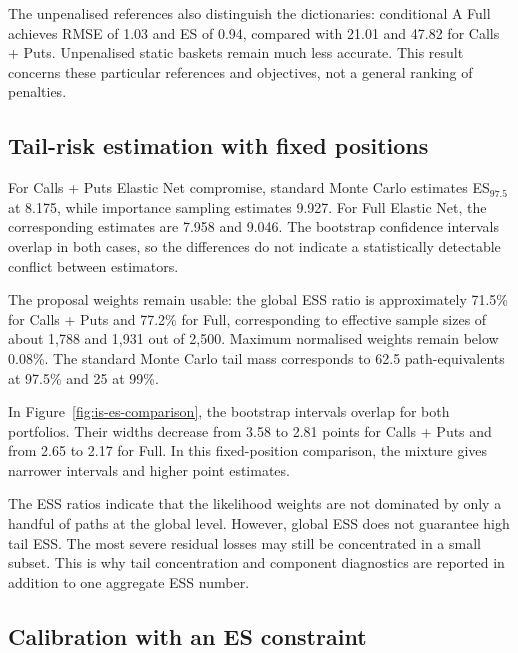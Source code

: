 The unpenalised references also distinguish the dictionaries: conditional A
Full achieves RMSE of 1.03 and ES of 0.94, compared with 21.01 and 47.82 for
Calls + Puts. Unpenalised static baskets remain much less accurate. This
result concerns these particular references and objectives, not a general
ranking of penalties.

\subsection{Tail-risk estimation with fixed positions}

For Calls + Puts Elastic Net compromise, standard Monte Carlo estimates ES$_{97.5}$ at 8.175, while importance sampling estimates 9.927. For Full Elastic Net, the corresponding estimates are 7.958 and 9.046. The bootstrap confidence intervals overlap in both cases, so the differences do not indicate a statistically detectable conflict between estimators.

The proposal weights remain usable: the global ESS ratio is approximately 71.5\% for Calls + Puts and 77.2\% for Full, corresponding to effective sample sizes of about 1,788 and 1,931 out of 2,500. Maximum normalised weights remain below 0.08\%. The standard Monte Carlo tail mass corresponds to 62.5 path-equivalents at 97.5\% and 25 at 99\%.


In Figure~\ref{fig:is-es-comparison}, the bootstrap intervals overlap for both portfolios. Their widths decrease from 3.58 to 2.81 points for Calls + Puts and from 2.65 to 2.17 for Full. In this fixed-position comparison, the mixture gives narrower intervals and higher point estimates.

The ESS ratios indicate that the likelihood weights are not dominated by only
a handful of paths at the global level. However, global ESS does not guarantee
high tail ESS. The most severe residual losses may still be concentrated in a
small subset. This is why tail concentration and component diagnostics are
reported in addition to one aggregate ESS number.

\subsection{Calibration with an ES constraint}

